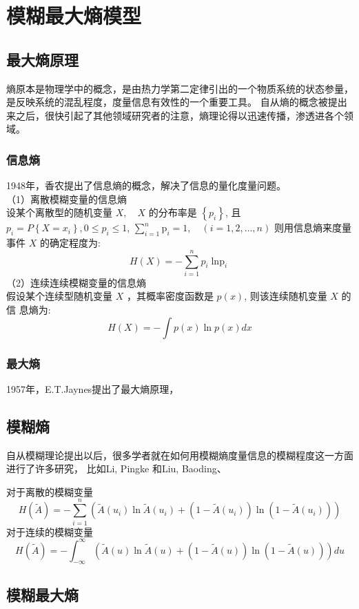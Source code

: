 \chapter[模糊最大熵模型]{模糊最大熵模型}
\section{最大熵原理}
熵原本是物理学中的概念，是由热力学第二定律引出的一个物质系统的状态参量，是反映系统的混乱程度，度量信息有效性的一个重要工具。
自从熵的概念被提出来之后，很快引起了其他领域研究者的注意，熵理论得以迅速传播，渗透进各个领域。
\subsection{信息熵}
1948年，香农\cite{1948A}提出了信息熵的概念，解决了信息的量化度量问题。\\
（1）离散模糊变量的信息熵\\
设某个离散型的随机变量 $X, \quad X$ 的分布率是 $\left\{p_{i}\right\}$, 且 $p_{i}=P\left\{X=x_{i}\right\}, 0 \leq p_{i} \leq 1$,
$\sum_{i=1}^n \mathrm{p}_i=1, \quad(i=1,2 ,\dots, n)$ 则用信息熵来度量事件 $X$ 的确定程度为:
\[
    H(X) =-\sum_{i=1}^{n} p_{i} \operatorname{\ln p}_{i}
\]
（2）连续连续模糊变量的信息熵\\
假设某个连续型随机变量 $X$ ，其概率密度函数是 $p(x)$, 则该连续随机变量 $X$ 的信
息熵为:
\[
    H(X)=-\int p(x) \ln p(x) d x
\]
\subsection{最大熵}
1957年，E.T.Jaynes提出了最大熵原理，
\section{模糊熵}
自从模糊理论提出以后，很多学者就在如何用模糊熵度量信息的模糊程度这一方面进行了许多研究，
比如Li, Pingke 和Liu, Baoding\cite{li2008entropy}、
\begin{definition}
    对于离散的模糊变量
    \[
        H(\tilde{A})=-\sum_{i=1}^{n}\left(\tilde{A}(u_i) \ln \tilde{A}(u_i)+\left(1-\tilde{A}(u_i)\right) \ln \left(1-\tilde{A}(u_i)\right)\right)
    \]
    对于连续的模糊变量
    \[
        H(\tilde{A})=-\int_{-\infty}^{\infty}(\tilde{A}(u) \ln \tilde{A}(u)+(1-\tilde{A}(u)) \ln (1-\tilde{A}(u))) d u
    \]
\end{definition}


\section{模糊最大熵}
